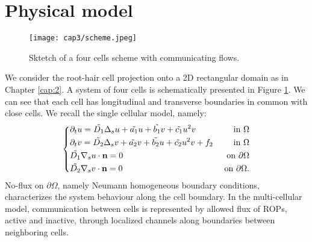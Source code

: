 \section{Physical model}\label{sec:PluriMod}
\begin{figure}
  \centering
  \texttt{[image: cap3/scheme.jpeg]}
  \caption{Sktetch of a four cells scheme with communicating flows.}
  \label{fig:2cell}
\end{figure}
We consider the root-hair cell projection onto a 2D rectangular domain as in Chapter \ref{cap:2}. A system of four cells is schematically presented in Figure \ref{fig:2cell}. We can see that each cell has longitudinal and transverse boundaries in common with close cells.
We recall the single cellular model, namely:
\begin{equation} \label{eq:singModel}
\left\lbrace
\begin{matrix}
  \begin{aligned}
    & \partial_t u = \Tilde{D_1} \Delta_s u + \Tilde{a_1} u + \Tilde{b_1} v + \Tilde{c_1} u^2 v & \ \text{in} \ \Omega\\
    & \partial_t v = \Tilde{D_2} \Delta_s v + \Tilde{a_2} v + \Tilde{b_2} u + \Tilde{c_2} u^2 v + f_2 & \ \text{in} \ \Omega \\
    & \Tilde{D_1} \nabla_s u \cdot \mathbf{n} = 0 & \ \text{on} \ \partial \Omega \\
    & \Tilde{D_2} \nabla_s v \cdot \mathbf{n} = 0 & \ \text{on} \ \partial \Omega.
  \end{aligned}
\end{matrix}
\right.
\end{equation}
No-flux on $\partial \Omega$, namely Neumann homogeneous boundary conditions, characterizes the system behaviour along the cell boundary.
In the multi-cellular model, communication between cells is represented by allowed flux of ROPs, active and inactive, through localized channels along boundaries between neighboring cells.


